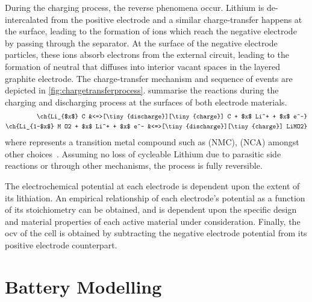 During  the   charging  process,  the   reverse  phenomena  occur.   Lithium  is
de-intercalated  from  the  positive  electrode and  a  similar  charge-transfer
happens   at   the   surface,   leading    to   the   formation   of   
ions   which   reach   the   negative   electrode   by   passing   through   the
separator.  At   the  surface  of   the  negative  electrode   particles,  these
ions   absorb   electrons   from   the  external   circuit,   leading   to   the
formation   of   neutral      that  diffuses   into   interior   vacant
spaces  in  the  layered   graphite  electrode.  The  charge-transfer  mechanism
and  sequence   of  events  are   depicted  in \cref{fig:chargetransferprocess}.
 summarise the  reactions during the
charging and discharging process at the surfaces of both electrode materials.
\begin{align}
    \ch{Li_{$x$} C                            &<=>[\tiny{discharge}][\tiny{charge}] C + $x$ Li^+ + $x$ e^-}\label{eq:NegElectrodeRxn}\\
    \ch{Li_{1-$x$} M O2 + $x$ Li^+  + $x$ e^- &<=>[\tiny{discharge}][\tiny{charge}] LiMO2}\label{eq:PosElectrodeRxn}
\end{align}
where       represents    a    transition   metal    compound   such    as
   (NMC),      (NCA)
amongst other  choices~\cite{Reddy2011}. Assuming  no loss of  cycleable Lithium
due to  parasitic side  reactions or  through other  mechanisms, the  process is
fully reversible.


The electrochemical potential at each electrode  is dependent upon the extent of
its  lithiation. An  empirical  relationship of  each  electrode's potential  as
a  function  of  its  stoichiometry  can be  obtained,  and  is  dependent  upon
the  specific design  and  material  properties of  each  active material  under
consideration. Finally, the \gls{ocv} of the cell is obtained by subtracting the
negative electrode potential from its positive electrode counterpart.


\section{Battery Modelling}

